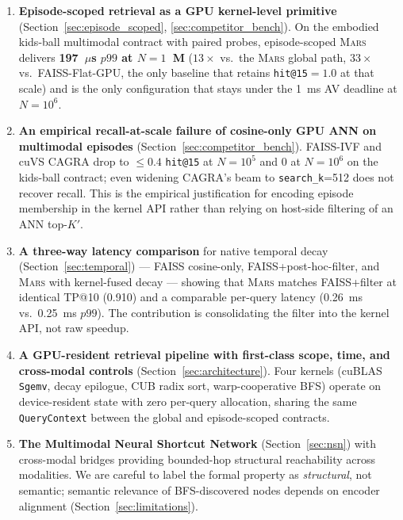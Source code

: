 \documentclass[11pt]{article}
\newcommand{\mars}{\textsc{Mars}}
\begin{document}
\begin{enumerate}
\item \textbf{Episode-scoped retrieval as a GPU kernel-level
  primitive} (Section~\ref{sec:episode_scoped},
  \ref{sec:competitor_bench}). On the embodied kids-ball multimodal
  contract with paired probes, episode-scoped \mars{} delivers
  \textbf{197~$\mu$s $p99$ at $N{=}1$~M} ($13\times$ vs.\ the
  \mars{} global path, $33\times$ vs.\ FAISS-Flat-GPU, the only
  baseline that retains \texttt{hit@15}${=}1.0$ at that scale) and is
  the only configuration that stays under the 1~ms AV deadline at
  $N{=}10^6$.

\item \textbf{An empirical recall-at-scale failure of cosine-only
  GPU ANN on multimodal episodes} (Section~\ref{sec:competitor_bench}).
  FAISS-IVF and cuVS CAGRA drop to $\le 0.4$ \texttt{hit@15} at
  $N{=}10^5$ and $0$ at $N{=}10^6$ on the kids-ball contract; even
  widening CAGRA's beam to \texttt{search\_k}=512 does not recover
  recall. This is the empirical justification for encoding episode
  membership in the kernel API rather than relying on host-side
  filtering of an ANN top-$K'$.

\item \textbf{A three-way latency comparison} for native temporal
  decay (Section~\ref{sec:temporal}) --- FAISS cosine-only,
  FAISS+post-hoc-filter, and \mars{} with kernel-fused decay ---
  showing that \mars{} matches FAISS+filter at identical TP@10 (0.910)
  and a comparable per-query latency (0.26~ms vs.\ 0.25~ms $p99$).
  The contribution is consolidating the filter into the kernel API,
  not raw speedup.

\item \textbf{A GPU-resident retrieval pipeline with first-class
  scope, time, and cross-modal controls}
  (Section~\ref{sec:architecture}). Four kernels (cuBLAS \texttt{Sgemv},
  decay epilogue, CUB radix sort, warp-cooperative BFS) operate on
  device-resident state with zero per-query allocation, sharing the
  same \texttt{QueryContext} between the global and episode-scoped
  contracts.

\item \textbf{The Multimodal Neural Shortcut Network}
  (Section~\ref{sec:nsn}) with cross-modal bridges providing
  bounded-hop structural reachability across modalities. We are
  careful to label the formal property as \emph{structural}, not
  semantic; semantic relevance of BFS-discovered nodes depends on
  encoder alignment (Section~\ref{sec:limitations}).


\end{enumerate}
\end{document}
